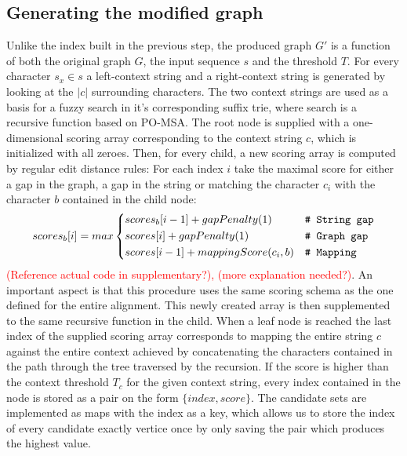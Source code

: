 \documentclass[thesis.tex]{subfiles}
\begin{document}
\subsection{Generating the modified graph}
Unlike the index built in the previous step, the produced graph $G'$ is a function of both the original graph $G$, the input sequence $s$ and the threshold $T$. For every character $s_x \in s$ a left-context string and a right-context string is generated by looking at the $|c|$ surrounding characters. The two context strings are used as a basis for a fuzzy search in it's corresponding suffix trie, where search is a recursive function based on PO-MSA. The root node is supplied with a one-dimensional scoring array corresponding to the context string $c$, which is initialized with all zeroes. Then, for every child, a new scoring array is computed by regular edit distance rules: For each index $i$ take the maximal score for either a gap in the graph, a gap in the string or matching the character $c_i$ with the character $b$ contained in the child node:
\begin{equation}
  scores_b[i] = max \begin{dcases}
    scores_b[i - 1] + gapPenalty(1) & \text{\texttt{\# String gap}}\\
    scores[i] + gapPenalty(1) & \text{\texttt{\# Graph gap}}\\
    scores[i - 1] + mappingScore(c_i, b) & \text{\texttt{\# Mapping}}\\
  \end{dcases}
\end{equation} 
\textcolor{red}{(Reference actual code in supplementary?), (more explanation needed?)}. An important aspect is that this procedure uses the same scoring schema as the one defined for the entire alignment. This newly created array is then supplemented to the same recursive function in the child. When a leaf node is reached the last index of the supplied scoring array corresponds to mapping the entire string $c$ against the entire context achieved by concatenating the characters contained in the path through the tree traversed by the recursion. If the score is higher than the context threshold $T_c$ for the given context string, every index contained in the node is stored as a pair on the form $\{index, score\}$. The candidate sets are implemented as maps with the index as a key, which allows us to store the index of every candidate exactly vertice once by only saving the pair which produces the highest value.\\
\par\noindent
\end{document}
